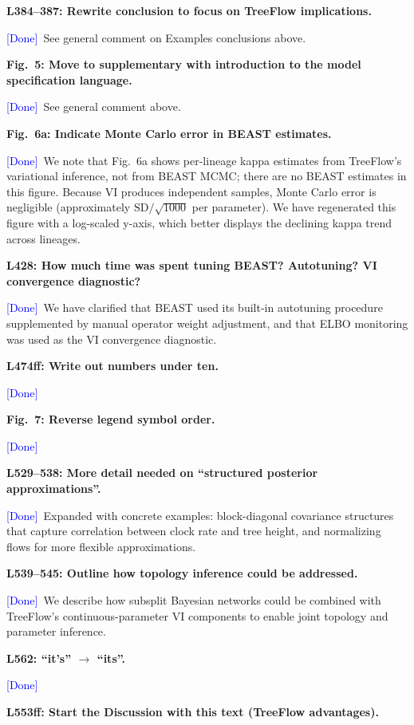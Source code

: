 \documentclass[11pt]{article}
\newcommand{\comment}[1]{\medskip\noindent\textbf{#1}\medskip}
\newcommand{\response}[1]{\noindent #1\medskip}
\newcommand{\done}{\textcolor{blue}{[Done]}}
\begin{document}
\comment{L384--387: Rewrite conclusion to focus on TreeFlow implications.}

\response{\done\ See general comment on Examples conclusions above.}

\comment{Fig.~5: Move to supplementary with introduction to the model specification language.}

\response{\done\ See general comment above.}

\comment{Fig.~6a: Indicate Monte Carlo error in BEAST estimates.}

\response{\done\ We note that Fig.~6a shows per-lineage kappa estimates from TreeFlow's variational inference, not from BEAST MCMC; there are no BEAST estimates in this figure. Because VI produces independent samples, Monte Carlo error is negligible (approximately $\mathrm{SD}/\sqrt{1000}$ per parameter). We have regenerated this figure with a log-scaled y-axis, which better displays the declining kappa trend across lineages.}

\comment{L428: How much time was spent tuning BEAST? Autotuning? VI convergence diagnostic?}

\response{\done\ We have clarified that BEAST used its built-in autotuning procedure supplemented by manual operator weight adjustment, and that ELBO monitoring was used as the VI convergence diagnostic.}

\comment{L474ff: Write out numbers under ten.}

\response{\done}

\comment{Fig.~7: Reverse legend symbol order.}

\response{\done}

\comment{L529--538: More detail needed on ``structured posterior approximations''.}

\response{\done\ Expanded with concrete examples: block-diagonal covariance structures that capture correlation between clock rate and tree height, and normalizing flows for more flexible approximations.}

\comment{L539--545: Outline how topology inference could be addressed.}

\response{\done\ We describe how subsplit Bayesian networks could be combined with TreeFlow's continuous-parameter VI components to enable joint topology and parameter inference.}

\comment{L562: ``it's'' $\to$ ``its''.}

\response{\done}

\comment{L553ff: Start the Discussion with this text (TreeFlow advantages).}
\end{document}
